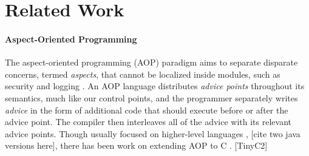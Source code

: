 \documentclass{llncs}
\begin{document}




\section{Related Work}
\label{sec:related}

\paragraph{Aspect-Oriented Programming}

The aspect-oriented programming (AOP) paradigm aims to separate disparate concerns,
termed {\em aspects}, that cannot be localized inside modules, such as security and logging \cite{}. %
An AOP language distributes {\em advice points} throughout its semantics, much like our
control points, and the programmer separately writes {\em advice} in the form of
additional code that should execute before or after the advice point. The compiler
then interleaves all of the advice with its relevant advice points. Though usually
focused on higher-level languages \cite{}, \cite{} [cite two java versions here],
there has been work on extending AOP to C \cite{}. [TinyC2]
\end{document}
